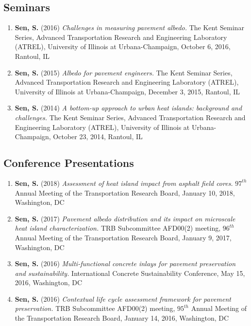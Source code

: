 \documentclass[12pt]{article}
\begin{document}
\subsection*{Seminars}
\begin{enumerate}[label=(\arabic*)]
	\item \textbf{Sen, S.} (2016) \textit{Challenges in measuring pavement albedo.} The Kent Seminar Series, Advanced Transportation Research and Engineering Laboratory (ATREL), University of Illinois at Urbana-Champaign, October 6, 2016, Rantoul, IL
	\item \textbf{Sen, S.} (2015) \textit{Albedo for pavement engineers.} The Kent Seminar Series, Advanced Transportation Research and Engineering Laboratory (ATREL), University of Illinois at Urbana-Champaign, December 3, 2015, Rantoul, IL
	\item \textbf{Sen, S.} (2014) \textit{A bottom-up approach to urban heat islands: background and challenges.} The Kent Seminar Series, Advanced Transportation Research and Engineering Laboratory (ATREL), University of Illinois at Urbana-Champaign, October 23, 2014, Rantoul, IL
\end{enumerate}

\subsection*{Conference Presentations}
\begin{enumerate}[label=(\arabic*)]
	\item \textbf{Sen, S.} (2018) \textit{Assessment of heat island impact from asphalt field cores.} $97^{th}$ Annual Meeting of the Transportation Research Board, January 10, 2018, Washington, DC
	\item \textbf{Sen, S.} (2017) \textit{Pavement albedo distribution and its impact on microscale heat island characterization.} TRB Subcommittee AFD00(2) meeting, $96^{th}$ Annual Meeting of the Transportation Research Board, January 9, 2017, Washington, DC
	\item \textbf{Sen, S.} (2016) \textit{Multi-functional concrete inlays for pavement preservation and sustainability.} International Concrete Sustainability Conference, May 15, 2016, Washington, DC
	\item \textbf{Sen, S.} (2016) \textit{Contextual life cycle assessment framework for pavement preservation.} TRB Subcommittee AFD00(2) meeting, $95^{th}$ Annual Meeting of the Transportation Research Board, January 14, 2016, Washington, DC
\end{enumerate}
\end{document}
